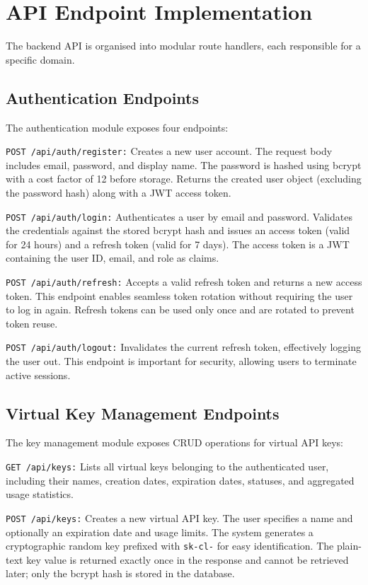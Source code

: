 \documentclass[oneside,12pt,a4paper]{report}
\begin{document}
\section{API Endpoint Implementation}

The backend API is organised into modular route handlers, each responsible for a specific domain.

\subsection{Authentication Endpoints}

The authentication module exposes four endpoints:

\texttt{POST /api/auth/register:} Creates a new user account. The request body includes email, password, and display name. The password is hashed using bcrypt with a cost factor of 12 before storage. Returns the created user object (excluding the password hash) along with a JWT access token.

\texttt{POST /api/auth/login:} Authenticates a user by email and password. Validates the credentials against the stored bcrypt hash and issues an access token (valid for 24 hours) and a refresh token (valid for 7 days). The access token is a JWT containing the user ID, email, and role as claims.

\texttt{POST /api/auth/refresh:} Accepts a valid refresh token and returns a new access token. This endpoint enables seamless token rotation without requiring the user to log in again. Refresh tokens can be used only once and are rotated to prevent token reuse.

\texttt{POST /api/auth/logout:} Invalidates the current refresh token, effectively logging the user out. This endpoint is important for security, allowing users to terminate active sessions.

\subsection{Virtual Key Management Endpoints}

The key management module exposes CRUD operations for virtual API keys:

\texttt{GET /api/keys:} Lists all virtual keys belonging to the authenticated user, including their names, creation dates, expiration dates, statuses, and aggregated usage statistics.

\texttt{POST /api/keys:} Creates a new virtual API key. The user specifies a name and optionally an expiration date and usage limits. The system generates a cryptographic random key prefixed with \texttt{sk-cl-} for easy identification. The plain-text key value is returned exactly once in the response and cannot be retrieved later; only the bcrypt hash is stored in the database.
\end{document}
